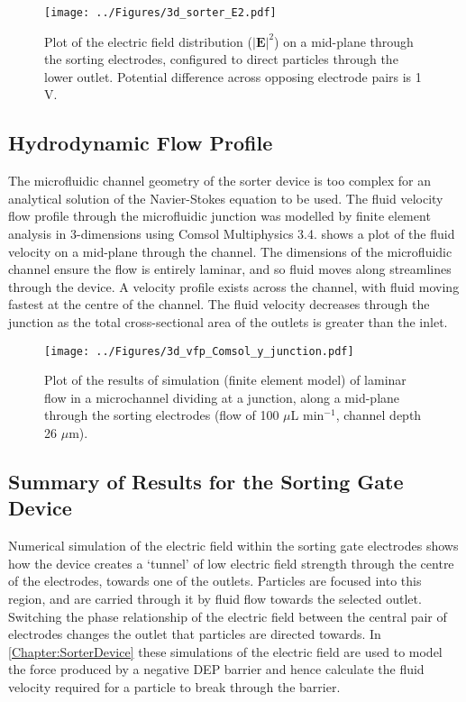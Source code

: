 \begin{figure}[p]
 \centering
 \texttt{[image: ../Figures/3d\_sorter\_E2.pdf]}
 \caption[Simulation of the electric field distribution ($\left | E \right | ^{2}$) within the sorting gate.]{Plot of the electric field distribution ($\left | \textbf{E} \right | ^{2}$) on a mid-plane through the sorting electrodes, configured to direct particles through the lower outlet. Potential difference across opposing electrode pairs is 1 V.}
 \label{fig:3d_sorter_E2}
\end{figure}

\subsection{Hydrodynamic Flow Profile}

The microfluidic channel geometry of the sorter device is too complex for an analytical solution of the Navier-Stokes equation to be used. The fluid velocity flow profile through the microfluidic junction was modelled by finite element analysis in 3-dimensions using Comsol Multiphysics 3.4.  shows a plot of the fluid velocity on a mid-plane through the channel. The dimensions of the microfluidic channel ensure the flow is entirely laminar, and so fluid moves along streamlines through the device. A velocity profile exists across the channel, with fluid moving fastest at the centre of the channel. The fluid velocity decreases through the junction as the total cross-sectional area of the outlets is greater than the inlet.

\begin{figure}[p]
 \centering
 \texttt{[image: ../Figures/3d\_vfp\_Comsol\_y\_junction.pdf]}
 \caption[Simulation of laminar flow in a microchannel dividing at a junction.]{Plot of the results of simulation (finite element model) of laminar flow in a microchannel dividing at a junction, along a mid-plane through the sorting electrodes (flow of 100 $\mu$L min$^{-1}$, channel depth 26 $\mu$m).}
 \label{fig:3d_vfp_Comsol_y_junction}
\end{figure}


\subsection{Summary of Results for the Sorting Gate Device}

Numerical simulation of the electric field within the sorting gate electrodes shows how the device creates a `tunnel' of low electric field strength through the centre of the electrodes, towards one of the outlets. Particles are focused into this region, and are carried through it by fluid flow towards the selected outlet. Switching the phase relationship of the electric field between the central pair of electrodes changes the outlet that particles are directed towards. In \cref{Chapter:SorterDevice} these simulations of the electric field are used to model the force produced by a negative DEP barrier and hence calculate the fluid velocity required for a particle to break through the barrier.

